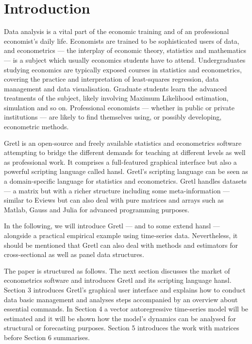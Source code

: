 \documentclass[11pt]{article}
\begin{document}
\section{Introduction}
\label{sec:intro}
Data analysis is a vital part of the economic training and of an professional economist's daily life. Economists are trained to be sophisticated users of data, and econometrics --- the interplay of economic theory, statistics and mathematics --- is a subject which usually economics students have to attend. %
Undergraduates studying economics are typically exposed courses in statistics and econometrics, covering the practice and interpretation of least-squares regression, data management and data visualisation. Graduate students learn the advanced treatments of the subject, likely involving Maximum Likelihood estimation, simulation and so on. Professional economists --- whether in public or private institutions --- are likely to find themselves using, or possibly developing, econometric methods.

Gretl is an open-source and freely available statistics and econometrics software attempting to bridge the different demands for teaching at different levels as well as professional work. It comprises a full-featured graphical interface but also a powerful scripting language called hansl. Gretl's scripting language can be seen as a domain-specific language for statistics and econometrics. Gretl handles datasets --- a matrix but with a richer structure including some meta-information %
--- similar to Eviews but can also deal with pure matrices and arrays such as Matlab, Gauss and Julia for advanced programming purposes.

In the following, we will introduce Gretl --- and to some extend hansl --- alongside a practical empirical example using time-series data. Nevertheless, it should be mentioned that Gretl can also deal with methods and estimators for cross-sectional as well as panel data structures.

The paper is structured as follows. The next section discusses the market of econometrics software and introduces Gretl and its scripting language hansl. Section 3 introduces Gretl's graphical user interface and explains how to conduct data basic management and analyses steps accompanied by an overview about essential commands. In Section 4 a vector autoregressive time-series model will be estimated and it will be shown how the model's dynamics can be analysed for structural or forecasting purposes. Section 5 introduces the work with matrices before Section 6 summarises.
\end{document}
